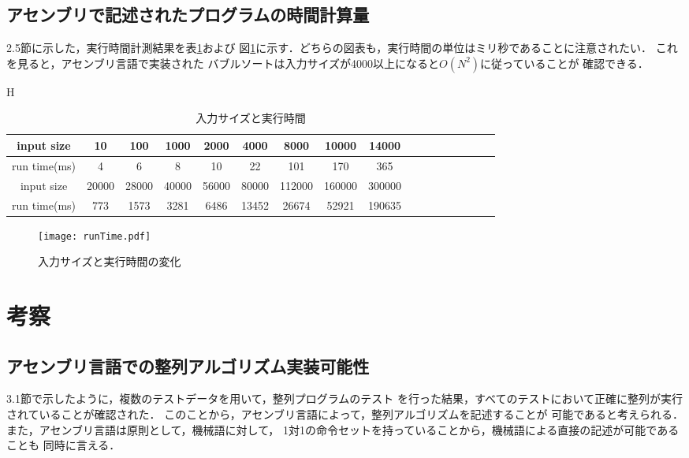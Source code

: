 \documentclass[a4j]{jarticle}
\begin{document}
\subsection{アセンブリで記述されたプログラムの時間計算量}
2.5節に示した，実行時間計測結果を表\ref{table2}および
図\ref{fig1}に示す．どちらの図表も，実行時間の単位はミリ秒であることに注意されたい．
これを見ると，アセンブリ言語で実装された
バブルソートは入力サイズが4000以上になると$O(N^{2})$に従っていることが
確認できる．

\begin{table}{H}
  \centering
  \caption{入力サイズと実行時間}
  \label{table2}
  \begin{tabular}{|c||c|c|c|c|c|c|c|c|c|c|c|c|c|c|c|c|}
    \hline
    input size & 10 & 100 & 1000 & 2000 & 4000 & 8000 & 10000& 14000 \\
    \hline
    run time(ms) & 4 & 6 & 8 & 10 & 22 & 101 & 170 & 365  \\
    \hline
    \hline
     input size & 20000 & 28000 & 40000 & 56000 & 80000 & 112000 & 160000& 300000\\
     \hline
     run time(ms) & 773 & 1573 & 3281 & 6486 & 13452 & 26674 & 52921 & 190635 \\
     \hline
  \end{tabular}
\end{table}
\begin{figure}[H]
  \caption{入力サイズと実行時間の変化}
  \label{fig1}
  \texttt{[image: runTime.pdf]}
\end{figure}

\section{考察}
\subsection{アセンブリ言語での整列アルゴリズム実装可能性}
3.1節で示したように，複数のテストデータを用いて，整列プログラムのテスト
を行った結果，すべてのテストにおいて正確に整列が実行されていることが確認された．
このことから，アセンブリ言語によって，整列アルゴリズムを記述することが
可能であると考えられる．また，アセンブリ言語は原則として，機械語に対して，
1対1の命令セットを持っていることから，機械語による直接の記述が可能であることも
同時に言える．
\end{document}
